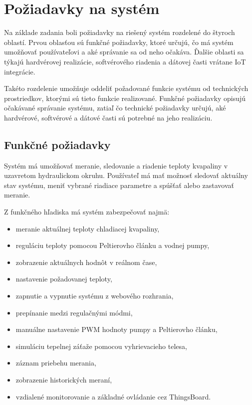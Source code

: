 
\section{Požiadavky na systém}

Na základe zadania boli požiadavky na riešený systém rozdelené do štyroch oblastí. Prvou oblasťou 
sú funkčné požiadavky, ktoré určujú, čo má systém umožňovať používateľovi a aké správanie sa od 
neho očakáva. Ďalšie oblasti sa týkajú hardvérovej realizácie, softvérového riadenia a dátovej 
časti vrátane IoT integrácie.

Takéto rozdelenie umožňuje oddeliť požadované funkcie systému od technických prostriedkov, 
ktorými sú tieto funkcie realizované. Funkčné požiadavky opisujú očakávané správanie systému, 
zatiaľ čo technické požiadavky určujú, aké hardvérové, softvérové a dátové časti sú potrebné 
na jeho realizáciu.

\subsection{Funkčné požiadavky}

Systém má umožňovať meranie, sledovanie a riadenie teploty kvapaliny v uzavretom hydraulickom okruhu. 
Používateľ má mať možnosť sledovať aktuálny stav systému, meniť vybrané riadiace parametre a spúšťať 
alebo zastavovať meranie.

Z funkčného hľadiska má systém zabezpečovať najmä:

\begin{itemize}
    \item meranie aktuálnej teploty chladiacej kvapaliny,
    \item reguláciu teploty pomocou Peltierovho článku a vodnej pumpy,
    \item zobrazenie aktuálnych hodnôt v reálnom čase,
    \item nastavenie požadovanej teploty,
    \item zapnutie a vypnutie systému z webového rozhrania,
    \item prepínanie medzi regulačnými módmi,
    \item manuálne nastavenie PWM hodnoty pumpy a Peltierovho článku,
    \item simuláciu tepelnej záťaže pomocou vyhrievacieho telesa,
    \item záznam priebehu merania,
    \item zobrazenie historických meraní,
    \item vzdialené monitorovanie a základné ovládanie cez ThingsBoard.
\end{itemize}

